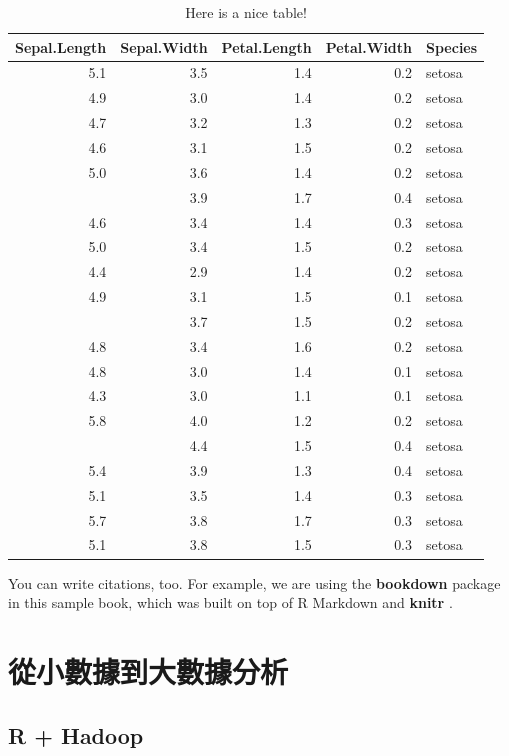 \documentclass[]{book}
\theoremstyle{definition}
\theoremstyle{definition}
\theoremstyle{remark}
\begin{document}
\begin{table}

\caption{\label{tab:nice-tab7}Here is a nice table!}
\centering
\begin{tabular}[t]{rrrrl}
\toprule
Sepal.Length & Sepal.Width & Petal.Length & Petal.Width & Species\\
\midrule
5.1 & 3.5 & 1.4 & 0.2 & setosa\\
4.9 & 3.0 & 1.4 & 0.2 & setosa\\
4.7 & 3.2 & 1.3 & 0.2 & setosa\\
4.6 & 3.1 & 1.5 & 0.2 & setosa\\
5.0 & 3.6 & 1.4 & 0.2 & setosa\\
\addlinespace
5.4 & 3.9 & 1.7 & 0.4 & setosa\\
4.6 & 3.4 & 1.4 & 0.3 & setosa\\
5.0 & 3.4 & 1.5 & 0.2 & setosa\\
4.4 & 2.9 & 1.4 & 0.2 & setosa\\
4.9 & 3.1 & 1.5 & 0.1 & setosa\\
\addlinespace
5.4 & 3.7 & 1.5 & 0.2 & setosa\\
4.8 & 3.4 & 1.6 & 0.2 & setosa\\
4.8 & 3.0 & 1.4 & 0.1 & setosa\\
4.3 & 3.0 & 1.1 & 0.1 & setosa\\
5.8 & 4.0 & 1.2 & 0.2 & setosa\\
\addlinespace
5.7 & 4.4 & 1.5 & 0.4 & setosa\\
5.4 & 3.9 & 1.3 & 0.4 & setosa\\
5.1 & 3.5 & 1.4 & 0.3 & setosa\\
5.7 & 3.8 & 1.7 & 0.3 & setosa\\
5.1 & 3.8 & 1.5 & 0.3 & setosa\\
\bottomrule
\end{tabular}
\end{table}

You can write citations, too. For example, we are using the
\textbf{bookdown} package \citep{R-bookdown} in this sample book, which
was built on top of R Markdown and \textbf{knitr} \citep{xie2015}.

\chapter{從小數據到大數據分析}\label{big}

\section{R + Hadoop}\label{r-hadoop}
\end{document}
